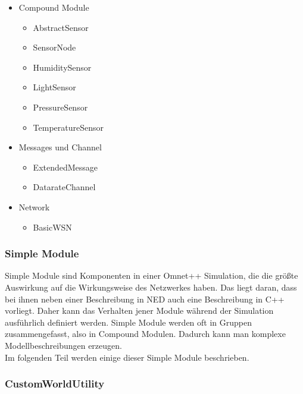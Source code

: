 \begin{minipage}{\textwidth}
\begin{itemize}{\label{enum:NedModules}}
\begin{multicols}{2}
\end{multicols}
\item Compound Module
\begin{multicols}{2}
\begin{itemize}
\item AbstractSensor
\item SensorNode
\item HumiditySensor
\item LightSensor
\item PressureSensor
\item TemperatureSensor 
\end{itemize}
\end{multicols}
\item Messages und Channel
\begin{multicols}{2}
\begin{itemize}
\item ExtendedMessage
\item DatarateChannel
\end{itemize}
\end{multicols}
\item Network
\begin{multicols}{2}
\begin{itemize}
\item BasicWSN
\end{itemize}
\end{multicols}
\end{itemize}
\end{minipage}

\subsubsection{Simple Module}

Simple Module sind Komponenten in einer Omnet++ Simulation, die die größte Auswirkung auf die Wirkungsweise des Netzwerkes haben. Das liegt daran, dass bei ihnen neben einer Beschreibung in NED auch eine Beschreibung in C++ vorliegt. Daher kann das Verhalten jener Module während der Simulation ausführlich definiert werden. Simple Module werden oft in Gruppen zusammengefasst, also in Compound Modulen. Dadurch kann man komplexe Modellbeschreibungen erzeugen.\\
Im folgenden Teil werden einige dieser Simple Module beschrieben.

\subsubsection{CustomWorldUtility}

